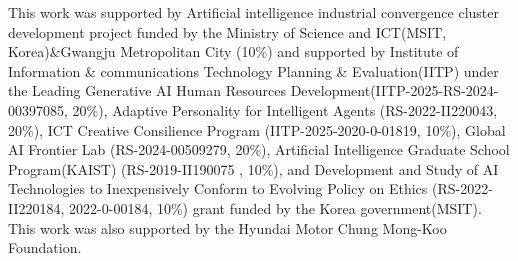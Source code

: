 This work was supported by Artificial intelligence industrial convergence cluster development project funded by the Ministry of Science and ICT(MSIT, Korea)\&Gwangju Metropolitan City (10\%) and supported by Institute of Information \& communications Technology Planning \& Evaluation(IITP) under the Leading Generative AI Human Resources Development(IITP-2025-RS-2024-00397085, 20\%), Adaptive Personality for Intelligent Agents (RS-2022-II220043, 20\%), ICT Creative Consilience Program (IITP-2025-2020-0-01819, 10\%), Global AI Frontier Lab (RS-2024-00509279, 20\%), Artificial Intelligence Graduate School Program(KAIST) (RS-2019-II190075 , 10\%), and Development and Study of AI Technologies to Inexpensively Conform to Evolving Policy on Ethics (RS-2022-II220184, 2022-0-00184, 10\%) grant funded by the Korea government(MSIT). This work was also supported by the Hyundai Motor Chung Mong-Koo Foundation.